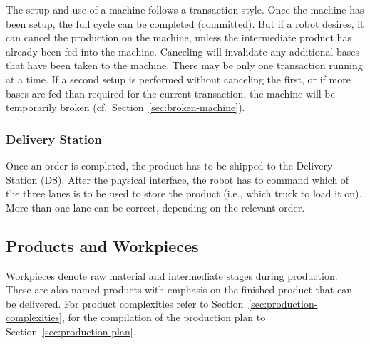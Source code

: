\documentclass[12pt,twoside]{article}
\newcommand{\refsec}[1]{Section~\ref{#1}}
\begin{document}
\noindent
The setup and use of a machine follows a transaction style. Once the
machine has been setup, the full cycle can be completed (committed).
But if a robot desires, it can cancel the production on the machine,
unless the intermediate product has already been fed into the
machine. Canceling will invalidate any additional bases that have
been taken to the machine. There may be only one transaction running
at a time. If a second setup is performed without canceling the
first, or if more bases are fed than required for the current
transaction, the machine will be temporarily broken
(cf.~\refsec{sec:broken-machine}).

\subsubsection{Delivery Station} 
\label{sec:delivery-station}
Once an order is completed, the product has to be shipped to the 
Delivery Station (DS). After the physical interface, the robot has to
command which of the three lanes is to be used to store the
product (i.e., which truck to load it on). More than one lane can be correct,
depending on the relevant order.

\subsection{Products and Workpieces}
\label{sec:products}
Workpieces denote raw material and intermediate stages during
production. These are also named products with emphasis on the
finished product that can be delivered. For product complexities refer
to \refsec{sec:production-complexities}, for the compilation of the
production plan to \refsec{sec:production-plan}.
\end{document}
